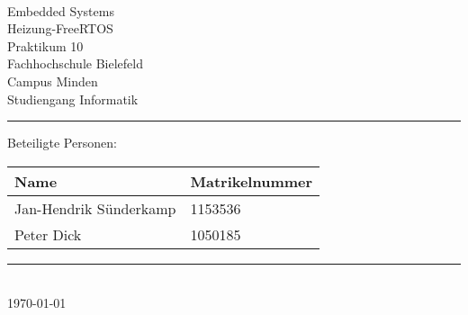\begin{titlepage}
   \mbox{}\vspace{5\baselineskip}\\
   \sffamily\huge
   \centering
   {\Huge Embedded Systems} \\
   Heizung-FreeRTOS\\
    \normalsize Praktikum 10
   \vspace{3\baselineskip}\\
   \rmfamily\Large
  Fachhochschule Bielefeld \\
  Campus Minden \\
  Studiengang Informatik
   \vspace{2\baselineskip}\\
\noindent\rule{15cm}{0.4pt}
Beteiligte Personen:
\begin{table}[H]
	\tablestyle
	\begin{tabular}{*{2}{v{0.45\textwidth}}}
		\hline
		\textbf{Name} & \textbf{Matrikelnummer}
		\tabularnewline
		\hline
		Jan-Hendrik Sünderkamp & 1153536\tabularnewline
		Peter Dick & 1050185\tabularnewline
	\end{tabular}
\end{table}

   \noindent\rule{15cm}{0.4pt}
      \vspace{1\baselineskip}\\
   \today
\end{titlepage}

